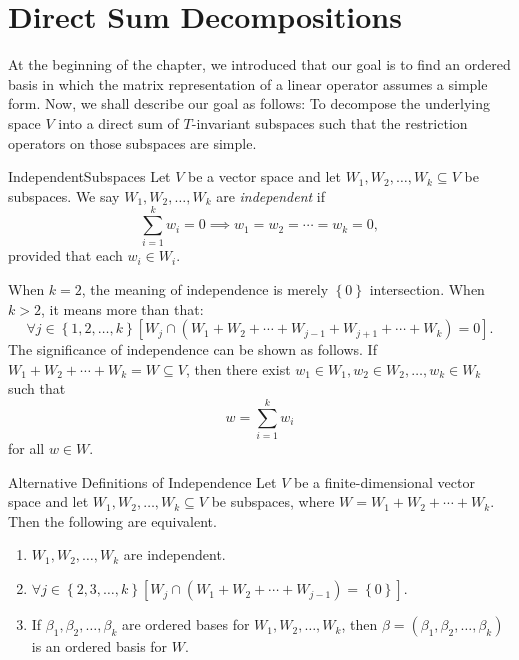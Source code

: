 \documentclass[linearalgebra]{subfiles}
\begin{document}
    \section{Direct Sum Decompositions}

    \begin{remark}
        At the beginning of the chapter, we introduced that our goal is to find an ordered basis in which the matrix representation of a linear operator assumes a simple form. Now, we shall describe our goal as follows: To decompose the underlying space $V$ into a direct sum of $T$-invariant subspaces such that the restriction operators on those subspaces are simple.
    \end{remark}
    
    \begin{definition}{Independent}{Subspaces}
        Let $V$ be a vector space and let $W_1, W_2, \ldots, W_k\subseteq V$ be subspaces. We say $W_1, W_2, \ldots, W_k$ are \emph{independent} if
        \begin{equation*}
            \sum^{k}_{i=1} w_i = 0\implies w_1=w_2=\cdots=w_k=0,
        \end{equation*}
        provided that each $w_i\in W_i$.
    \end{definition}

    \begin{remark}
        When $k=2$, the meaning of independence is merely $\left\lbrace 0 \right\rbrace$ intersection. When $k>2$, it means more than that:
        \begin{equation*}
            \forall j\in \left\lbrace 1, 2, \ldots, k \right\rbrace \left[ W_j\cap \left( W_1+W_2+\cdots+W_{j-1}+W_{j+1}+\cdots+W_k \right) = 0 \right].
        \end{equation*}
        The significance of independence can be shown as follows. If $W_1+W_2+\cdots+W_k=W\subseteq V$, then there exist $w_1\in W_1, w_2\in W_2,\ldots,w_k\in W_k$ such that
        \begin{equation*}
            w = \sum^{k}_{i=1} w_i
        \end{equation*}
        for all $w\in W$.
    \end{remark}

    \begin{prop}{Alternative Definitions of Independence}
        Let $V$ be a finite-dimensional vector space and let $W_1, W_2, \ldots, W_k\subseteq V$ be subspaces, where $W = W_1+W_2+\cdots+W_k$. Then the following are equivalent.
        \begin{enumerate}
            \item $W_1, W_2, \ldots, W_k$ are independent.
            \item $\forall j\in \left\lbrace 2, 3, \ldots, k \right\rbrace \left[ W_j\cap \left( W_1+W_2+\cdots+W_{j-1} \right) = \left\lbrace 0 \right\rbrace  \right]$.
            \item If $\beta_1, \beta_2, \ldots, \beta_k$ are ordered bases for $W_1, W_2, \ldots, W_k$, then $\beta = \left( \beta_1, \beta_2, \ldots, \beta_k \right)$ is an ordered basis for $W$.
        \end{enumerate}
    \end{prop}
\end{document}
